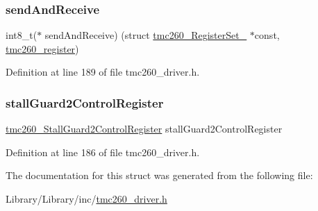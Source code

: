 \subsubsection{\texorpdfstring{send\+And\+Receive}{sendAndReceive}}
{\footnotesize\ttfamily int8\+\_\+t($\ast$  send\+And\+Receive) (struct \mbox{\hyperlink{structtmc260___register_set__}{tmc260\+\_\+\+Register\+Set\+\_\+}} $\ast$const, \mbox{\hyperlink{tmc260__driver_8h_a4552d2ee758c08501723a6dc78d26dc7}{tmc260\+\_\+register}})}



Definition at line 189 of file tmc260\+\_\+driver.\+h.

\mbox{\label{structtmc260___register_set___a259edf50b3ce148e4cee8d78134f021b}} 
\subsubsection{\texorpdfstring{stall\+Guard2\+Control\+Register}{stallGuard2ControlRegister}}
{\footnotesize\ttfamily \mbox{\hyperlink{tmc260__driver_8h_afa0a9cd31ee349e1fea8ff665665ad45}{tmc260\+\_\+\+Stall\+Guard2\+Control\+Register}} stall\+Guard2\+Control\+Register}



Definition at line 186 of file tmc260\+\_\+driver.\+h.



The documentation for this struct was generated from the following file\+:\begin{DoxyCompactItemize}
\item 
Library/\+Library/inc/\mbox{\hyperlink{tmc260__driver_8h}{tmc260\+\_\+driver.\+h}}\end{DoxyCompactItemize}

